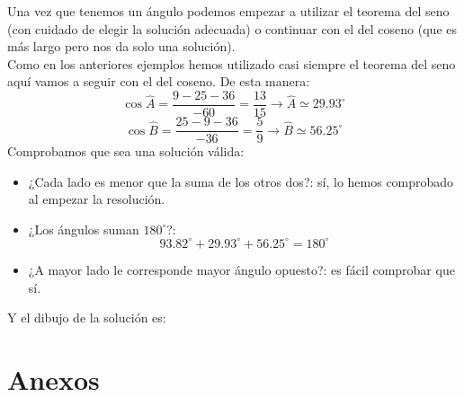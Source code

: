 \documentclass[a4paper,11pt,answers]{exam}
\newcommand{\degree}{^\circ}
\newcommand\unidad[1]{\,\text{#1}}
\begin{document}
\begin{solution}
  Una vez que tenemos un ángulo podemos empezar a utilizar el teorema del seno (con cuidado de
  elegir la solución adecuada) o continuar con el del coseno (que es más largo pero nos da solo una
  solución).\\
  Como en los anteriores ejemplos hemos utilizado casi siempre el teorema del seno aquí vamos a
  seguir con el del coseno. De esta manera:
  \[\cos \widehat{A} = \frac{9 - 25 - 36}{-60} = \frac{13}{15} \longrightarrow
    \widehat{A} \simeq 29.93\degree\]
  \[\cos \widehat{B} = \frac{25 - 9 - 36}{-36} = \frac{5}{9} \longrightarrow
    \widehat{B} \simeq 56.25\degree\]
  Comprobamos que sea una solución válida:
  \begin{itemize}
  \item ¿Cada lado es menor que la suma de los otros dos?: sí, lo hemos comprobado al empezar la
    resolución.
  \item ¿Los ángulos suman $180\degree$?: \[93.82\degree + 29.93\degree + 56.25\degree = 180\degree\]
  \item ¿A mayor lado le corresponde mayor ángulo opuesto?: es fácil comprobar que sí.
  \end{itemize}
  Y el dibujo de la solución es:
  \begin{center}
  \end{center}
\end{solution}

\appendix
\renewcommand{\thepart}{}
\renewcommand{\partname}{}
\part{Anexos}
\renewcommand{\thesection}{\Roman{section}}
\end{document}
